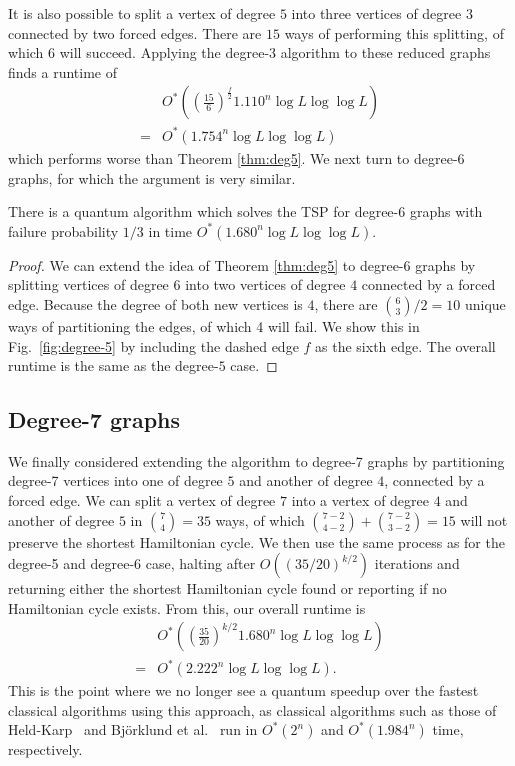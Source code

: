 %
It is also possible to split a vertex of degree $5$ into three vertices of degree $3$ connected by two forced edges. There are $15$ ways of performing this splitting, of which $6$ will succeed. Applying the degree-$3$ algorithm to these reduced graphs finds a runtime of
%
\begin{align*}
&O^*\left(\left(\frac{15}{6}\right)^{\frac{f}{2}}1.110^n\log L \log \log L\right)\\
 = &O^*(1.754^n\log L \log \log L)
\end{align*}
%
\noindent which performs worse than Theorem \ref{thm:deg5}. We next turn to degree-6 graphs, for which the argument is very similar.

\begin{theorem}
There is a quantum algorithm which solves the TSP for degree-$6$ graphs with failure probability $1/3$ in time $O^*(1.680^n\log L \log \log L)$.
\end{theorem}

\begin{proof}
We can extend the idea of Theorem \ref{thm:deg5} to degree-6 graphs by splitting vertices of degree $6$ into two vertices of degree $4$ connected by a forced edge. Because the degree of both new vertices is $4$, there are $\binom{6}{3}/2 = 10$ unique ways of partitioning the edges, of which 4 will fail. We show this in Fig.\ \ref{fig:degree-5} by including the dashed edge $f$ as the sixth edge. The overall runtime is the same as the degree-$5$ case.
\end{proof}

\subsection{Degree-7 graphs}

We finally considered extending the algorithm to degree-7 graphs by partitioning degree-7 vertices into one of degree $5$ and another of degree $4$, connected by a forced edge. We can split a vertex of degree $7$ into a vertex of degree $4$ and another of degree $5$ in $\binom{7}{4} = 35$ ways, of which $\binom{7-2}{4-2} + \binom{7-2}{3-2} = 15$ will not preserve the shortest Hamiltonian cycle. We then use the same process as for the degree-5 and degree-6 case, halting after $O((35/20)^{k/2})$ iterations and returning either the shortest Hamiltonian cycle found or reporting if no Hamiltonian cycle exists. From this, our overall runtime is
%
\begin{align*}
&O^*\left(\left(\frac{35}{20}\right)^{k/2}1.680^n\log L \log \log L\right)\\
=&O^*(2.222^n\log L \log \log L).
\end{align*}
%
This is the point where we no longer see a quantum speedup over the fastest classical algorithms using this approach, as classical algorithms such as those of Held-Karp~\cite{held1962} and Bj{\"o}rklund et al.~\cite{bjorklund2008} run in $O^*(2^n)$ and $O^*(1.984^n)$ time, respectively.

